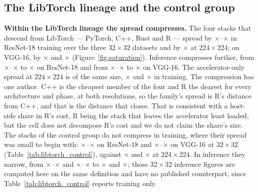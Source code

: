 \subsection{The LibTorch lineage and the control group}
\label{app:sat-libtorch}

\textbf{Within the LibTorch lineage the spread compresses.} The four stacks that
descend from LibTorch --- PyTorch, C++, Rust and R --- spread by
\vSatLibtorchRefSpreadTrainResnetMin$\times$--\vSatLibtorchRefSpreadTrainResnetMax$\times$
in ResNet-18 training over the three $32\times32$ datasets and by
\vSatLibtorchSpreadTrainResnet$\times$ at $224\times224$; on VGG-16, by
\vSatLibtorchRefSpreadTrainVggMax$\times$ and \vSatLibtorchSpreadTrainVgg$\times$
(Figure~\ref{fig:saturation}).
Inference compresses further, from
\vSatLibtorchRefSpreadInferResnetMin$\times$--\vSatLibtorchRefSpreadInferResnetMax$\times$
to \vSatLibtorchSpreadInferResnet$\times$ on ResNet-18 and from
\vSatLibtorchRefSpreadInferVggMin$\times$--\vSatLibtorchRefSpreadInferVggMax$\times$
to \vSatLibtorchSpreadInferVgg$\times$ on VGG-16. The accelerator-only spread
at $224\times224$ is of the same size, \vSatLibtorchSpreadGpuTrainResnet$\times$
and \vSatLibtorchSpreadGpuTrainVgg$\times$ in training. The compression has one
author. C++ is the cheapest member of the four and R the dearest for every
architecture and phase, at both resolutions, so the family's spread is R's distance from C++, and that
is the distance that closes. That is consistent with a host-side share in R's
cost, R being the stack that leaves the accelerator least loaded, but the cell
does not decompose R's cost and we do not claim the share's size. The \vCtrlStacks{} stacks
of the control group do not compress in training, where their spread was small
to begin with:
\vSatCtrlRefSpreadTrainResnetMin$\times$--\vSatCtrlRefSpreadTrainResnetMax$\times$
on ResNet-18 and
\vSatCtrlRefSpreadTrainVggMin$\times$--\vSatCtrlRefSpreadTrainVggMax$\times$ on
VGG-16 at $32\times32$ (Table~\ref{tab:libtorch_control}), against
\vSatCtrlSpreadTrainResnet$\times$ and \vSatCtrlSpreadTrainVgg$\times$ at
$224\times224$. In inference they narrow, from
\vSatCtrlRefSpreadInferResnetMin$\times$--\vSatCtrlRefSpreadInferResnetMax$\times$
and
\vSatCtrlRefSpreadInferVggMin$\times$--\vSatCtrlRefSpreadInferVggMax$\times$ to
\vSatCtrlSpreadInferResnet$\times$ and \vSatCtrlSpreadInferVgg$\times$; those
$32\times32$ inference figures are computed here on the same definition and have
no published counterpart, since Table~\ref{tab:libtorch_control} reports
training only.

